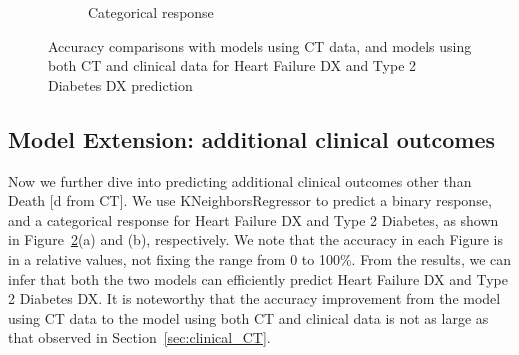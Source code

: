 \begin{figure}[!h]
\begin{subfigure}{.48\textwidth}
        \caption{Categorical response}
        \label{fig:categorical_outcome}
    \end{subfigure}
    \caption{Accuracy comparisons with models using CT data, and models using both CT and clinical data for Heart Failure DX and Type 2 Diabetes DX prediction}
    \label{fig:clinical_outcome}
\end{figure}

\subsection{Model Extension: additional clinical outcomes}

Now we further dive into predicting additional clinical outcomes other than Death $[$d from CT$]$.
We use KNeighborsRegressor to predict a binary response, and a categorical response for Heart Failure DX and Type 2 Diabetes, as shown in Figure~\ref{fig:clinical_outcome}(a) and (b), respectively.
We note that the accuracy in each Figure is in a relative values, not fixing the range from 0 to 100\%.
From the results, we can infer that both the two models can efficiently predict Heart Failure DX and Type 2 Diabetes DX.
It is noteworthy that the accuracy improvement from the model using CT data to the model using both CT and clinical data is not as large as that observed in Section~\ref{sec:clinical_CT}.


